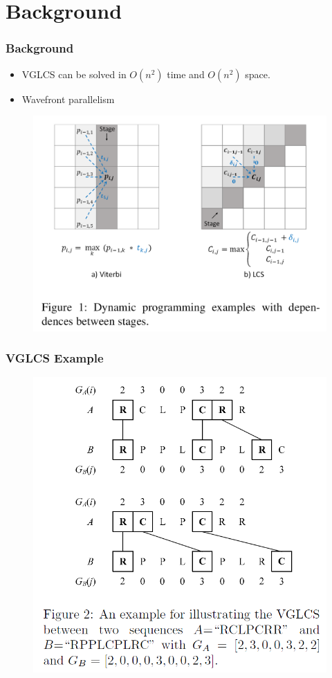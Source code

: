 \section{Background}

\begin{frame}
    \frametitle{Background}
    \begin{itemize}
    	\setlength\itemsep{1em}
    	\item VGLCS can be solved in $O(n^2)$ time and $O(n^2)$ space.
    	\item Wavefront parallelism
    \end{itemize}
    \begin{figure}
		\includegraphics[scale=0.20]{figure/fig-wavefront-dp.png}
	\end{figure}
\end{frame}

\begin{frame}
	\frametitle{VGLCS Example}
	\begin{figure}
		\includegraphics[scale=0.3]{figure/fig-VGLCS-ex.png}
	\end{figure}
\end{frame}